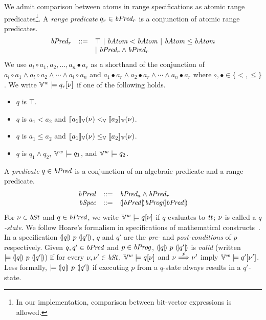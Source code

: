 We admit comparison between atoms in range specifications as atomic range predicates\footnote{In our implementation, comparison between bit-vector expressions is allowed.}.
A \emph{range predicate} $q_r \in \mathit{bPred_r}$ is a conjunction of atomic range predicates.
\[
\begin{array}{rcl}
  \mathit{bPred_r} & ::= & \top \ |\ \mathit{bAtom} < \mathit{bAtom} \ |\ \mathit{bAtom} \leq \mathit{bAtom} \\
           &     & |\ \mathit{bPred_r} \wedge \mathit{bPred_r} \\
\end{array}
\]
We use $a_l \circ a_1, a_2, \ldots, a_n \bullet a_r$ as a shorthand of the conjunction of $a_l \circ a_1 \wedge a_l \circ a_2 \wedge \cdots \wedge a_l \circ a_n$ and $a_1 \bullet a_r \wedge a_2 \bullet a_r \wedge \cdots \wedge a_n \bullet a_r$ where $\circ, \bullet \in \{<, \leq\}$.
We write $\mathbb{V}^w \models q_r[\nu]$ if one of the following holds.
\begin{itemize}
  \item $q$ is $\top$.
  \item $q$ is $a_1 < a_2$ and $[\![{a_1}]\!]_{\mathbb{V}}(\nu) <_{\mathbb{V}} [\![{a_2}]\!]_{\mathbb{V}}(\nu)$.
  \item $q$ is $a_1 \leq a_2$ and $[\![{a_1}]\!]_{\mathbb{V}}(\nu) \leq_{\mathbb{V}} [\![{a_2}]\!]_{\mathbb{V}}(\nu)$.
  \item $q$ is $q_1 \wedge q_2$, $\mathbb{V}^w \models q_1$, and $\mathbb{V}^w \models q_2$.
\end{itemize}

A \emph{predicate} $q \in \mathit{bPred}$ is a conjunction of an algebraic predicate and a range predicate.
\[
\begin{array}{rcl}
  \mathit{bPred} & ::= & \mathit{bPred_a} \wedge \mathit{bPred_r} \\
  \mathit{bSpec} & ::= & {(\!|}{\mathit{bPred}}{|\!)} \mathit{bProg} {(\!|}{\mathit{bPred}}{|\!)}
\end{array}
\]
For $\nu \in \mathit{bSt}$ and $q \in \mathit{bPred}$, we write $\mathbb{V}^w \models q[\nu]$ if $q$ evaluates to $\mathit{tt}$; $\nu$ is called a \emph{$q$-state}.
We follow Hoare's formalism in specifications of mathematical constructs~\cite{H:69:ABCP}.
In a specification ${(\!|}{q}{|\!)}~{p}~{(\!|}{q'}{|\!)}$, $q$ and $q'$ are the \emph{pre}- and \emph{post-conditions} of $p$ respectively.
Given $q, q' \in \mathit{bPred}$ and $p \in \mathit{bProg}$, ${(\!|}{q}{|\!)}~{p}~{(\!|}{q'}{|\!)}$ is \emph{valid} (written $\models {(\!|}{q}{|\!)}~{p}~{(\!|}{q'}{|\!)}$) if for every $\nu, \nu' \in \mathit{bSt}$, $\mathbb{V}^w \models q[\nu]$ and $\nu \overset{p}{\Longrightarrow} \nu'$ imply $\mathbb{V}^w \models q'[\nu']$.
Less formally, $\models {(\!|}{q}{|\!)}~{p}~{(\!|}{q'}{|\!)}$ if executing $p$ from a $q$-state always results in a $q'$-state.

